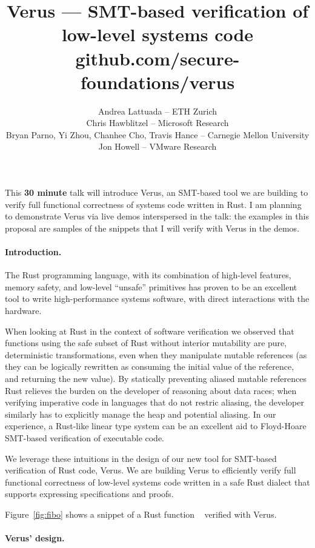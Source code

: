 \documentclass[11pt,twocolumn]{article}
\date{}
\title{Verus --- SMT-based verification of low-level systems code\\\small github.com/secure-foundations/verus}
\author{Andrea Lattuada -- ETH Zurich \\
Chris Hawblitzel -- Microsoft Research \\
Bryan Parno, Yi Zhou, Chanhee Cho, Travis Hance -- Carnegie Mellon University \\
Jon Howell -- VMware Research}
\newcommand{\codesize}{\fontsize{8pt}{9pt}\selectfont}
\newcommand{\textcode}[1]{{\codesize\ttfamily{#1}}}
\renewcommand{\section}[1]{\paragraph{#1.}}
\newcommand*\circled[1]{\,\tikz[baseline=(char.base)]{
            \node[shape=circle,draw,inner sep=.7pt] (char) {\textcode{#1}};}\,}
\newcommand{\clref}[1]{\circled{\ref{#1}}}
\begin{document}
\maketitle

This \textbf{30 minute} talk will introduce Verus, an SMT-based tool we are building to
verify full functional correctness of systems code written in Rust. I am
planning to demonstrate Verus via live demos interspersed in the talk:
the examples in this proposal are samples of the snippets that I will
verify with Verus in the demos.

\section{Introduction}\label{introduction}

The Rust programming language, with its combination of high-level
features, memory safety, and low-level ``unsafe'' primitives has proven
to be an excellent tool to write high-performance systems software, with
direct interactions with the hardware.

When looking at Rust in the context of software verification
we observed that functions using the safe subset of Rust without
interior mutability are pure, deterministic transformations, even when
they manipulate mutable references (as they can be logically rewritten
as consuming the initial value of the reference, and returning the new
value). By statically preventing aliased mutable references Rust
relieves the burden on the developer of reasoning about data races; when
verifying imperative code in languages that do not restric aliasing, the
developer similarly has to explicitly manage the heap and potential
aliasing. In our experience, a Rust-like linear type system can be an
excellent aid to Floyd-Hoare SMT-based verification of executable code.

We leverage these intuitions in the design of our new tool for SMT-based
verification of Rust code, Verus.
We are building Verus to efficiently verify full functional correctness
of low-level systems code written in a safe Rust dialect that supports
expressing specifications and proofs.

Figure~\ref{fig:fibo} shows a snippet of a Rust
function~\clref{clnum:fn-fibo-impl} verified with Verus.

\section{Verus' design}\label{verus-design}
\end{document}
